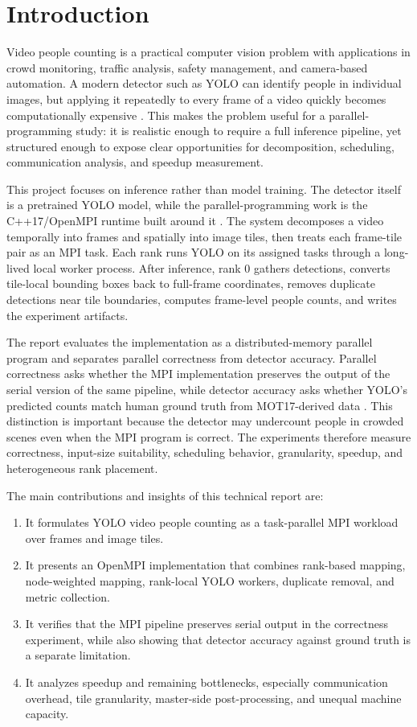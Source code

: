 \chapter{Introduction}

Video people counting is a practical computer vision problem with applications in crowd monitoring, traffic analysis, safety management, and camera-based automation. A modern detector such as YOLO can identify people in individual images, but applying it repeatedly to every frame of a video quickly becomes computationally expensive \cite{redmon2016yolo,ultralytics2026}. This makes the problem useful for a parallel-programming study: it is realistic enough to require a full inference pipeline, yet structured enough to expose clear opportunities for decomposition, scheduling, communication analysis, and speedup measurement.

This project focuses on inference rather than model training. The detector itself is a pretrained YOLO model, while the parallel-programming work is the C++17/OpenMPI runtime built around it \cite{openmpi2026,mpiforum2023}. The system decomposes a video temporally into frames and spatially into image tiles, then treats each frame-tile pair as an MPI task. Each rank runs YOLO on its assigned tasks through a long-lived local worker process. After inference, rank 0 gathers detections, converts tile-local bounding boxes back to full-frame coordinates, removes duplicate detections near tile boundaries, computes frame-level people counts, and writes the experiment artifacts.

The report evaluates the implementation as a distributed-memory parallel program and separates parallel correctness from detector accuracy. Parallel correctness asks whether the MPI implementation preserves the output of the serial version of the same pipeline, while detector accuracy asks whether YOLO's predicted counts match human ground truth from MOT17-derived data \cite{motchallenge}. This distinction is important because the detector may undercount people in crowded scenes even when the MPI program is correct. The experiments therefore measure correctness, input-size suitability, scheduling behavior, granularity, speedup, and heterogeneous rank placement.

The main contributions and insights of this technical report are:
\begin{enumerate}
    \item It formulates YOLO video people counting as a task-parallel MPI workload over frames and image tiles.
    \item It presents an OpenMPI implementation that combines rank-based mapping, node-weighted mapping, rank-local YOLO workers, duplicate removal, and metric collection.
    \item It verifies that the MPI pipeline preserves serial output in the correctness experiment, while also showing that detector accuracy against ground truth is a separate limitation.
    \item It analyzes speedup and remaining bottlenecks, especially communication overhead, tile granularity, master-side post-processing, and unequal machine capacity.
\end{enumerate}
